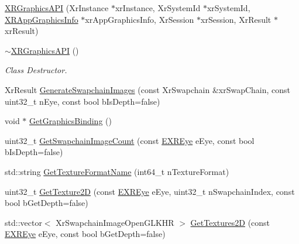 \begin{DoxyCompactItemize}
\item 
\mbox{\hyperlink{class_open_x_r_provider_1_1_x_r_graphics_a_p_i_a7e10c7996b39f1f5740a2a0145e25a9c}{X\+R\+Graphics\+A\+PI}} (Xr\+Instance $\ast$xr\+Instance, Xr\+System\+Id $\ast$xr\+System\+Id, \mbox{\hyperlink{struct_open_x_r_provider_1_1_x_r_app_graphics_info}{X\+R\+App\+Graphics\+Info}} $\ast$xr\+App\+Graphics\+Info, Xr\+Session $\ast$xr\+Session, Xr\+Result $\ast$xr\+Result)
\item 
\mbox{\hyperlink{class_open_x_r_provider_1_1_x_r_graphics_a_p_i_af28c914f792ab81e991644d517ce054c}{$\sim$\+X\+R\+Graphics\+A\+PI}} ()
\begin{DoxyCompactList}\small\item\em Class Destructor. \end{DoxyCompactList}\item 
Xr\+Result \mbox{\hyperlink{class_open_x_r_provider_1_1_x_r_graphics_a_p_i_a093e5898b7868dad3beebc3d3ed63054}{Generate\+Swapchain\+Images}} (const Xr\+Swapchain \&xr\+Swap\+Chain, const uint32\+\_\+t n\+Eye, const bool b\+Is\+Depth=false)
\item 
void $\ast$ \mbox{\hyperlink{class_open_x_r_provider_1_1_x_r_graphics_a_p_i_a2c474282e17bf45b87bae7e0c95efa57}{Get\+Graphics\+Binding}} ()
\item 
uint32\+\_\+t \mbox{\hyperlink{class_open_x_r_provider_1_1_x_r_graphics_a_p_i_a41503928a4dfb8832ee9485228fe8372}{Get\+Swapchain\+Image\+Count}} (const \mbox{\hyperlink{namespace_open_x_r_provider_a8aa379869e30772896e6c468eb54f155}{E\+X\+R\+Eye}} e\+Eye, const bool b\+Is\+Depth=false)
\item 
std\+::string \mbox{\hyperlink{class_open_x_r_provider_1_1_x_r_graphics_a_p_i_a6ff0969adb40b16428d5489d07c1d4f5}{Get\+Texture\+Format\+Name}} (int64\+\_\+t n\+Texture\+Format)
\item 
uint32\+\_\+t \mbox{\hyperlink{class_open_x_r_provider_1_1_x_r_graphics_a_p_i_abb6b87fd88ffb9df871405acefc90011}{Get\+Texture2D}} (const \mbox{\hyperlink{namespace_open_x_r_provider_a8aa379869e30772896e6c468eb54f155}{E\+X\+R\+Eye}} e\+Eye, uint32\+\_\+t n\+Swapchain\+Index, const bool b\+Get\+Depth=false)
\item 
std\+::vector$<$ Xr\+Swapchain\+Image\+Open\+G\+L\+K\+HR $>$ \mbox{\hyperlink{class_open_x_r_provider_1_1_x_r_graphics_a_p_i_ae3cfae0f48a2095420b3f0e3319ab2a1}{Get\+Textures2D}} (const \mbox{\hyperlink{namespace_open_x_r_provider_a8aa379869e30772896e6c468eb54f155}{E\+X\+R\+Eye}} e\+Eye, const bool b\+Get\+Depth=false)
\end{DoxyCompactItemize}

